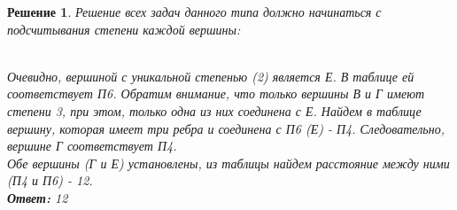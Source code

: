 \documentclass[12pt]{article}
\theoremstyle{problem_style}
\newtheorem{solution}{Решение}[subsection]
\begin{document}
\begin{solution}
Решение всех задач данного типа должно начинаться с подсчитывания степени каждой вершины:
\begin{figure}[h]
    \centering
\end{figure}\\
Очевидно, вершиной с уникальной степенью (2) является Е. В таблице ей соответствует П6.
Обратим внимание, что только вершины В и Г имеют степени 3, при этом, только одна из них соединена с Е. Найдем в таблице вершину, которая имеет три ребра и соединена с П6 (Е) - П4. Следовательно, вершине Г соответствует П4.\\
Обе вершины (Г и Е) установлены, из таблицы найдем расстояние между ними (П4 и П6) - 12.\\
\textbf{Ответ:} 12
\end{solution}
\break
\end{document}
